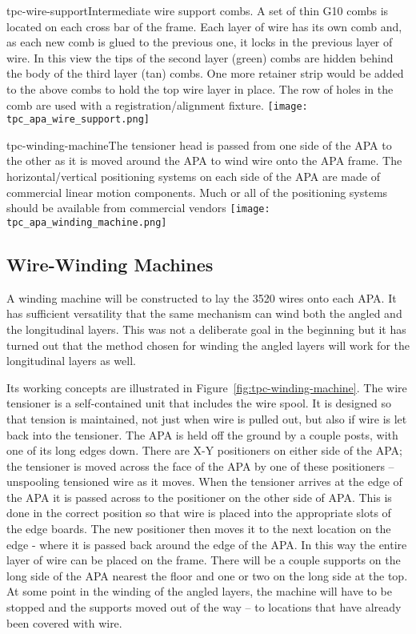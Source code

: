 \begin{cdrfigure}{tpc-wire-support}{Intermediate wire support combs.  A set of thin G10 combs is located on each cross bar of the frame.  Each layer of wire has its own comb and, as each new comb is glued to the previous one, it locks in the previous layer of wire.  In this view the tips of the second layer (green) combs are hidden behind the body of the third layer (tan) combs.  One more retainer strip would be added to the above combs to hold the top wire layer in place.  The row of holes in the comb are used with a registration/alignment fixture.}
\texttt{[image: tpc\_apa\_wire\_support.png]}
\end{cdrfigure}


\begin{cdrfigure}{tpc-winding-machine}{The tensioner head is passed from one side of the APA to the other as it is moved around the APA to wind wire onto the APA frame.  The horizontal/vertical positioning systems on each side of the APA are made of commercial linear motion components.  Much or all of the positioning systems should be available from commercial vendors}
\texttt{[image: tpc\_apa\_winding\_machine.png]}
\end{cdrfigure}


\subsection{Wire-Winding Machines}

A winding machine will be constructed to lay the 3520 wires onto each APA. It has sufficient versatility that the same mechanism can wind both the angled and the longitudinal layers.  This was not a deliberate goal in the beginning but it has turned out that the method chosen for winding the angled layers will work for the longitudinal layers as well.
 
Its working concepts are illustrated in Figure~\ref{fig:tpc-winding-machine}. 
The wire tensioner is a self-contained unit that includes the wire spool.  It is designed so that tension is maintained, not just when wire is pulled out, but also if wire is let back into the tensioner.  The APA is held off the ground by a couple posts, with one of its long edges down.  There are X-Y positioners on either side of the APA; the tensioner is moved across the face of the APA by one of these positioners -- unspooling tensioned wire as it moves.  When the tensioner arrives at the edge of the APA it is passed across to the positioner on the other side of APA.  This is done in the correct position so that wire is placed into the appropriate slots of the edge boards. The new positioner then moves it to the next location on the edge - where it is passed back around the edge of the APA.  In this way the entire layer of wire can be placed on the frame.  There will be a couple supports on the long side of the APA nearest the floor and one or two on the long side at the top.  At some point in the winding of the angled layers, the machine will have to be stopped and the supports moved out of the way -- to locations that have already been covered with wire.

